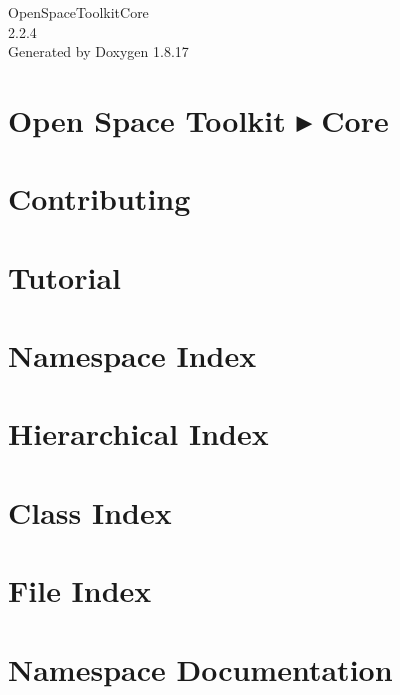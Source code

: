 \let\mypdfximage\pdfximage\def\pdfximage{\immediate\mypdfximage}\documentclass[twoside]{book}
\newcommand{\+}{\discretionary{\mbox{\scriptsize$\hookleftarrow$}}{}{}}
\newcommand{\clearemptydoublepage}{%
  \newpage{\pagestyle{empty}\cleardoublepage}%
}
\begin{document}
\hypersetup{pageanchor=false,
             bookmarksnumbered=true,
             pdfencoding=unicode
            }
\begin{titlepage}
\vspace*{7cm}
\begin{center}%
{\Large Open\+Space\+Toolkit\+Core \\[1ex]\large 2.\+2.\+4 }\\
\vspace*{1cm}
{\large Generated by Doxygen 1.8.17}\\
\end{center}
\end{titlepage}
\clearemptydoublepage
{}
\tableofcontents
\clearemptydoublepage
{}
\hypersetup{pageanchor=true}

\chapter{Open Space Toolkit ▸ Core}
\label{index}\hypertarget{index}{}
\chapter{Contributing}
\label{md__c_o_n_t_r_i_b_u_t_i_n_g}

\chapter{Tutorial}
\label{md_docs__tutorial}

\chapter{Namespace Index}

\chapter{Hierarchical Index}

\chapter{Class Index}

\chapter{File Index}

\chapter{Namespace Documentation}














\end{document}
